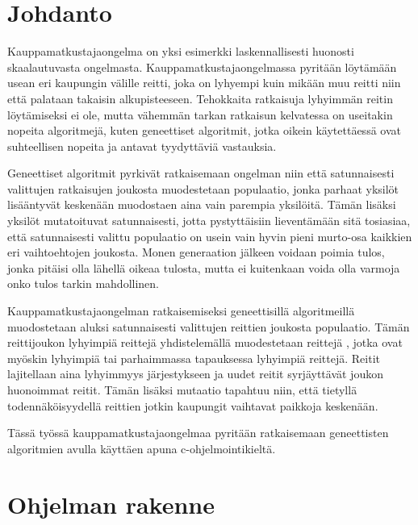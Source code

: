 \documentclass[12pt]{article}
\numberwithin{equation}{section}
\numberwithin{table}{section}
\begin{document}
\maketitle

\newpage{}



\section{Johdanto}
Kauppamatkustajaongelma on yksi esimerkki laskennallisesti huonosti skaalautuvasta ongelmasta. Kauppamatkustajaongelmassa pyritään löytämään usean eri kaupungin välille reitti, joka on lyhyempi kuin mikään muu reitti niin että palataan takaisin alkupisteeseen. Tehokkaita ratkaisuja lyhyimmän reitin löytämiseksi ei ole, mutta vähemmän tarkan ratkaisun kelvatessa on useitakin nopeita algoritmejä, kuten geneettiset algoritmit, jotka oikein käytettäessä ovat suhteellisen nopeita ja antavat tyydyttäviä vastauksia.

Geneettiset algoritmit pyrkivät ratkaisemaan ongelman niin että satunnaisesti valittujen ratkaisujen joukosta muodestetaan populaatio, jonka parhaat yksilöt lisääntyvät keskenään muodostaen aina vain parempia yksilöitä. Tämän lisäksi yksilöt mutatoituvat satunnaisesti, jotta pystyttäisiin lieventämään sitä tosiasiaa, että satunnaisesti valittu populaatio on usein vain hyvin pieni murto-osa kaikkien eri vaihtoehtojen joukosta. Monen generaation jälkeen voidaan poimia tulos, jonka pitäisi olla lähellä oikeaa tulosta, mutta ei kuitenkaan voida olla varmoja onko tulos tarkin mahdollinen.

Kauppamatkustajaongelman ratkaisemiseksi geneettisillä algoritmeillä muodostetaan aluksi satunnaisesti valittujen reittien joukosta populaatio. Tämän reittijoukon lyhyimpiä reittejä yhdistelemällä muodestetaan reittejä , jotka ovat myöskin lyhyimpiä tai parhaimmassa tapauksessa lyhyimpiä reittejä. Reitit lajitellaan aina lyhyimmyys järjestykseen ja uudet reitit syrjäyttävät joukon huonoimmat reitit. Tämän lisäksi mutaatio tapahtuu niin, että tietyllä todennäköisyydellä reittien jotkin kaupungit vaihtavat paikkoja keskenään.

Tässä työssä kauppamatkustajaongelmaa pyritään ratkaisemaan geneettisten algoritmien avulla käyttäen apuna c-ohjelmointikieltä. 


\section{Ohjelman rakenne}
\end{document}
